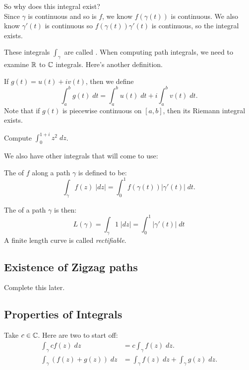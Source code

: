 So why does this integral exist?\\

Since $\gamma$ is continuous and so is $f$, we know $f(\gamma(t))$
is continuous.
We also know $\gamma'(t)$ is continuous so $f(\gamma(t))\gamma'(t)$
is continuous, so the integral exists.

These integrals $\int_{\gamma}$ are called .
When computing path integrals, we need to examine $\R$ to $\C$ 
integrals.  Here's another definition.

\begin{definition}[$\R$ to $\C$ integrals]
    If $g(t) = u(t) + iv(t)$, then we define
    \[ \int_a^b g(t) \; dt = \int_a^b u(t) \; dt + i
    \int_a^b v(t) \; dt. \]
    Note that if $g(t)$ is piecewise continuous on $[a,b]$,
    then its Riemann integral exists.
\end{definition}

\begin{exercise}
    Compute $\int_0^{1+i} z^2 \; dz$.
\end{exercise}

We also have other integrals that will come to use:
\begin{definition}
    The  of $f$ along a path $\gamma$ is
    defined to be:
    \[ \int_{\gamma} f(z) \; |dz| = \int_0^1 f(\gamma(t)) 
    |\gamma'(t)| \; dt. \]
\end{definition}

The  of a path $\gamma$ is then:
\[ L(\gamma) = \int_{\gamma} 1 \; |dz| = \int_0^1 |\gamma'(t)| \; dt\]
A finite length curve is called \textit{rectifiable}.

\subsection{Existence of Zigzag paths}
Complete this later.



\subsection{Properties of Integrals}
Take $c \in \operatorname{\mathbb{C}}$.
Here are two to start off:
\begin{align}
    \int_{\gamma} cf(z) \; dz &= c \int_{\gamma} f(z) \; dz. \\
    \int_{\gamma} (f(z) + g(z)) \; dz &=
        \int_{\gamma} f(z) \; dz + \int_{\gamma} g(z) \; dz.
\end{align}

